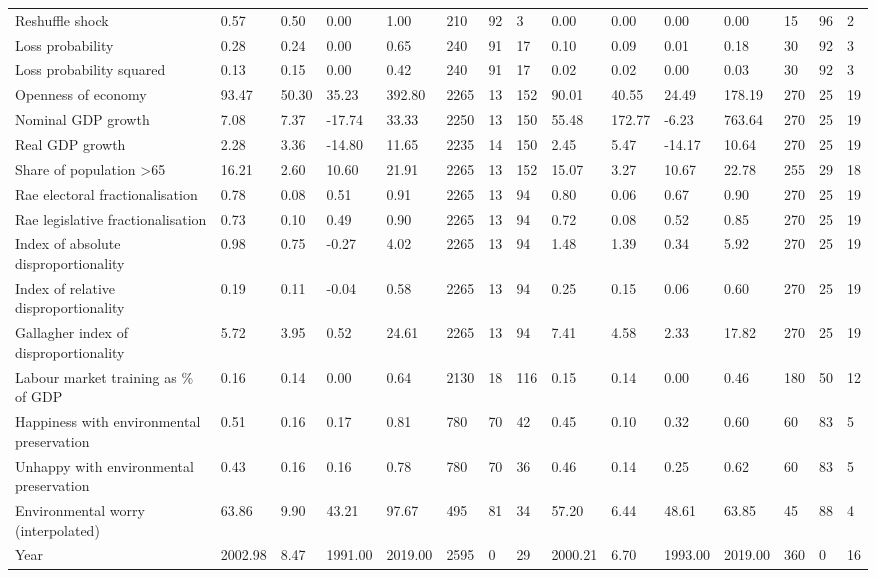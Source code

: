 \begin{longtable}{lllllllllllllll}
\addlinespace
Reshuffle shock & 0.57 & 0.50 & 0.00 & 1.00 & 210 & 92 & 3 & 0.00 & 0.00 & 0.00 & 0.00 & 15 & 96 & 2\\
Loss probability & 0.28 & 0.24 & 0.00 & 0.65 & 240 & 91 & 17 & 0.10 & 0.09 & 0.01 & 0.18 & 30 & 92 & 3\\
Loss probability squared & 0.13 & 0.15 & 0.00 & 0.42 & 240 & 91 & 17 & 0.02 & 0.02 & 0.00 & 0.03 & 30 & 92 & 3\\
Openness of economy & 93.47 & 50.30 & 35.23 & 392.80 & 2265 & 13 & 152 & 90.01 & 40.55 & 24.49 & 178.19 & 270 & 25 & 19\\
Nominal GDP growth & 7.08 & 7.37 & -17.74 & 33.33 & 2250 & 13 & 150 & 55.48 & 172.77 & -6.23 & 763.64 & 270 & 25 & 19\\
\addlinespace
Real GDP growth & 2.28 & 3.36 & -14.80 & 11.65 & 2235 & 14 & 150 & 2.45 & 5.47 & -14.17 & 10.64 & 270 & 25 & 19\\
Share of population >65 & 16.21 & 2.60 & 10.60 & 21.91 & 2265 & 13 & 152 & 15.07 & 3.27 & 10.67 & 22.78 & 255 & 29 & 18\\
Rae electoral fractionalisation & 0.78 & 0.08 & 0.51 & 0.91 & 2265 & 13 & 94 & 0.80 & 0.06 & 0.67 & 0.90 & 270 & 25 & 19\\
Rae legislative fractionalisation & 0.73 & 0.10 & 0.49 & 0.90 & 2265 & 13 & 94 & 0.72 & 0.08 & 0.52 & 0.85 & 270 & 25 & 19\\
Index of absolute disproportionality & 0.98 & 0.75 & -0.27 & 4.02 & 2265 & 13 & 94 & 1.48 & 1.39 & 0.34 & 5.92 & 270 & 25 & 19\\
\addlinespace
Index of relative disproportionality & 0.19 & 0.11 & -0.04 & 0.58 & 2265 & 13 & 94 & 0.25 & 0.15 & 0.06 & 0.60 & 270 & 25 & 19\\
Gallagher index of disproportionality & 5.72 & 3.95 & 0.52 & 24.61 & 2265 & 13 & 94 & 7.41 & 4.58 & 2.33 & 17.82 & 270 & 25 & 19\\
Labour market training as \% of GDP & 0.16 & 0.14 & 0.00 & 0.64 & 2130 & 18 & 116 & 0.15 & 0.14 & 0.00 & 0.46 & 180 & 50 & 12\\
Happiness with environmental preservation & 0.51 & 0.16 & 0.17 & 0.81 & 780 & 70 & 42 & 0.45 & 0.10 & 0.32 & 0.60 & 60 & 83 & 5\\
Unhappy with environmental preservation & 0.43 & 0.16 & 0.16 & 0.78 & 780 & 70 & 36 & 0.46 & 0.14 & 0.25 & 0.62 & 60 & 83 & 5\\
\addlinespace
Environmental worry (interpolated) & 63.86 & 9.90 & 43.21 & 97.67 & 495 & 81 & 34 & 57.20 & 6.44 & 48.61 & 63.85 & 45 & 88 & 4\\
Year & 2002.98 & 8.47 & 1991.00 & 2019.00 & 2595 & 0 & 29 & 2000.21 & 6.70 & 1993.00 & 2019.00 & 360 & 0 & 16\\
\bottomrule
\end{longtable}
